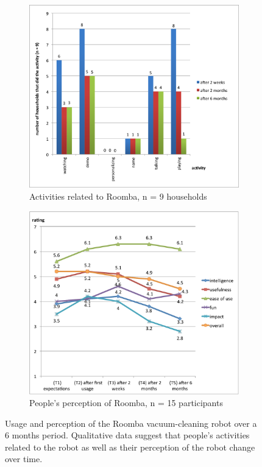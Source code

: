 \documentclass{frontiersSCNS} %
\begin{document}
\begin{figure}[h!]
        \centering
        \begin{subfigure}[t]{0.48\columnwidth}
                \includegraphics[width=\textwidth]{roomba-activities.png}
                \caption{Activities related to Roomba, n = 9 households}
                \label{fig:roomba-activities}
        \end{subfigure}%
        \hspace{0.5cm} 
        \begin{subfigure}[t]{0.48\columnwidth}
                \includegraphics[width=\textwidth]{roomba-perception.pdf}
                \caption{People's perception of Roomba, n = 15 participants}
                \label{fig:roomba-perception}
        \end{subfigure}
    \caption{Usage and perception of the Roomba vacuum-cleaning robot over a 6 months period. Qualitative data suggest that people's activities related to the robot as well as their perception of the robot change over time.}
    \label{fig:roomba}
\end{figure}
\end{document}
